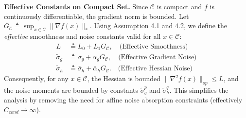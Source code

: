 \documentclass{article}
\theoremstyle{plain}
\theoremstyle{definition}
\theoremstyle{remark}
\begin{document}
\textbf{Effective Constants on Compact Set.}
Since $\mathcal{C}$ is compact and $f$ is continuously differentiable, the gradient norm is bounded. Let $G_{\mathcal{C}} \triangleq \sup_{x \in \mathcal{C}} \|\nabla f(x)\|_*$.
Using Assumption 4.1 and 4.2, we define the \textit{effective} smoothness and noise constants valid for all $x \in \mathcal{C}$:
\begin{align}
    L &\triangleq L_0 + L_1 G_{\mathcal{C}}, \quad \text{(Effective Smoothness)} \\
    \tilde{\sigma}_g &\triangleq \sigma_g + \alpha_g G_{\mathcal{C}}, \quad \text{(Effective Gradient Noise)} \\
    \tilde{\sigma}_h &\triangleq \bar{\sigma}_h + \bar{\alpha}_h G_{\mathcal{C}}. \quad \text{(Effective Hessian Noise)}
\end{align}
Consequently, for any $x \in \mathcal{C}$, the Hessian is bounded $\|\nabla^2 f(x)\|_{op} \le L$, and the noise moments are bounded by constants $\tilde{\sigma}_g^p$ and $\tilde{\sigma}_h^q$. This simplifies the analysis by removing the need for affine noise absorption constraints (effectively $C_{cond} \to \infty$).
\end{document}
